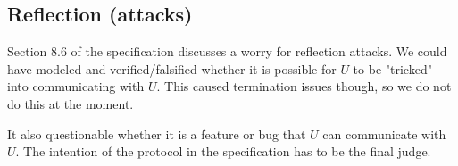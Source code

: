 \documentclass[a4paper,11pt]{article}
\theoremstyle{plain}
\theoremstyle{plain}
\begin{document}
\subsection{Reflection (attacks)}
Section 8.6 of the specification discusses a worry for reflection attacks.
%
We could have modeled and verified/falsified whether it is possible for
$U$ to be "tricked" into communicating with $U$.
%
This caused termination issues though, so we do not do this at the moment.
%

It also questionable whether it is a feature or bug that $U$ can communicate
with $U$.
%
The intention of the protocol in the specification has to be the final judge.
%

%
%

\end{document}
